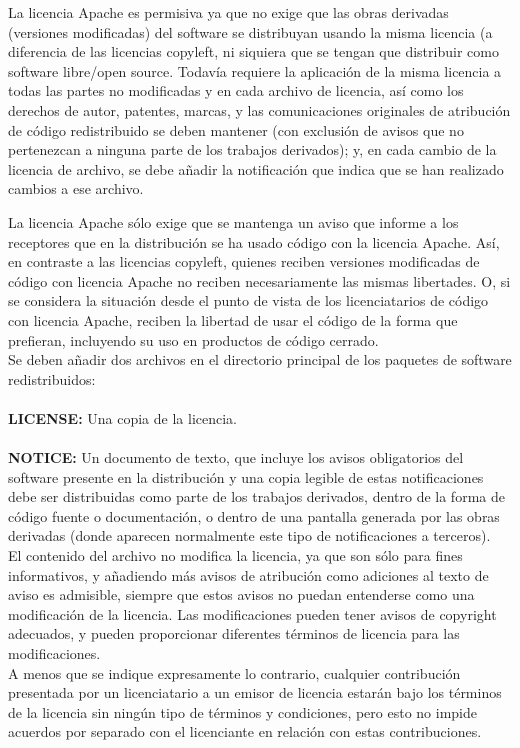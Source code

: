 La licencia Apache es permisiva ya que no exige que las obras derivadas (versiones modificadas) del software se distribuyan usando la misma licencia (a diferencia de las licencias copyleft, ni siquiera que se tengan que distribuir como software libre/open source. Todavía requiere la aplicación de la misma licencia a todas las partes no modificadas y en cada archivo de licencia, así como los derechos de autor, patentes, marcas, y las comunicaciones originales de atribución de código redistribuido se deben mantener (con exclusión de avisos que no pertenezcan a ninguna parte de los trabajos derivados); y, en cada cambio de la licencia de archivo, se debe añadir la notificación que indica que se han realizado cambios a ese archivo.


La licencia Apache sólo exige que se mantenga un aviso que informe a los receptores que en la distribución se ha usado código con la licencia Apache. Así, en contraste a las licencias copyleft, quienes reciben versiones modificadas de código con licencia Apache no reciben necesariamente las mismas libertades. O, si se considera la situación desde el punto de vista de los licenciatarios de código con licencia Apache, reciben la libertad de usar el código de la forma que prefieran, incluyendo su uso en productos de código cerrado.\\

Se deben añadir dos archivos en el directorio principal de los paquetes de software redistribuidos:\\\\
\textbf{LICENSE:}
Una copia de la licencia.\\\\
\textbf{NOTICE:}
Un documento de texto, que incluye los avisos obligatorios del software presente en la distribución y una copia legible de estas notificaciones debe ser distribuidas como parte de los trabajos derivados, dentro de la forma de código fuente o documentación, o dentro de una pantalla generada por las obras derivadas (donde aparecen normalmente este tipo de notificaciones a terceros).\\

El contenido del archivo no modifica la licencia, ya que son sólo para fines informativos, y añadiendo más avisos de atribución como adiciones al texto de aviso es admisible, siempre que estos avisos no puedan entenderse como una modificación de la licencia. Las modificaciones pueden tener avisos de copyright adecuados, y pueden proporcionar diferentes términos de licencia para las modificaciones.\\

A menos que se indique expresamente lo contrario, cualquier contribución presentada por un licenciatario a un emisor de licencia estarán bajo los términos de la licencia sin ningún tipo de términos y condiciones, pero esto no impide acuerdos por separado con el licenciante en relación con estas contribuciones.\\

